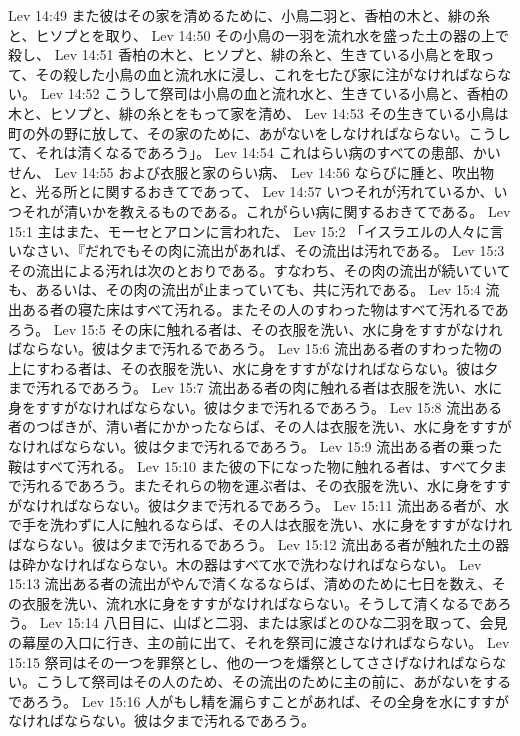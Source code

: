 Lev 14:49  また彼はその家を清めるために、小鳥二羽と、香柏の木と、緋の糸と、ヒソプとを取り、
Lev 14:50  その小鳥の一羽を流れ水を盛った土の器の上で殺し、
Lev 14:51  香柏の木と、ヒソプと、緋の糸と、生きている小鳥とを取って、その殺した小鳥の血と流れ水に浸し、これを七たび家に注がなければならない。
Lev 14:52  こうして祭司は小鳥の血と流れ水と、生きている小鳥と、香柏の木と、ヒソプと、緋の糸とをもって家を清め、
Lev 14:53  その生きている小鳥は町の外の野に放して、その家のために、あがないをしなければならない。こうして、それは清くなるであろう」。
Lev 14:54  これはらい病のすべての患部、かいせん、
Lev 14:55  および衣服と家のらい病、
Lev 14:56  ならびに腫と、吹出物と、光る所とに関するおきてであって、
Lev 14:57  いつそれが汚れているか、いつそれが清いかを教えるものである。これがらい病に関するおきてである。
Lev 15:1  主はまた、モーセとアロンに言われた、
Lev 15:2  「イスラエルの人々に言いなさい、『だれでもその肉に流出があれば、その流出は汚れである。
Lev 15:3  その流出による汚れは次のとおりである。すなわち、その肉の流出が続いていても、あるいは、その肉の流出が止まっていても、共に汚れである。
Lev 15:4  流出ある者の寝た床はすべて汚れる。またその人のすわった物はすべて汚れるであろう。
Lev 15:5  その床に触れる者は、その衣服を洗い、水に身をすすがなければならない。彼は夕まで汚れるであろう。
Lev 15:6  流出ある者のすわった物の上にすわる者は、その衣服を洗い、水に身をすすがなければならない。彼は夕まで汚れるであろう。
Lev 15:7  流出ある者の肉に触れる者は衣服を洗い、水に身をすすがなければならない。彼は夕まで汚れるであろう。
Lev 15:8  流出ある者のつばきが、清い者にかかったならば、その人は衣服を洗い、水に身をすすがなければならない。彼は夕まで汚れるであろう。
Lev 15:9  流出ある者の乗った鞍はすべて汚れる。
Lev 15:10  また彼の下になった物に触れる者は、すべて夕まで汚れるであろう。またそれらの物を運ぶ者は、その衣服を洗い、水に身をすすがなければならない。彼は夕まで汚れるであろう。
Lev 15:11  流出ある者が、水で手を洗わずに人に触れるならば、その人は衣服を洗い、水に身をすすがなければならない。彼は夕まで汚れるであろう。
Lev 15:12  流出ある者が触れた土の器は砕かなければならない。木の器はすべて水で洗わなければならない。
Lev 15:13  流出ある者の流出がやんで清くなるならば、清めのために七日を数え、その衣服を洗い、流れ水に身をすすがなければならない。そうして清くなるであろう。
Lev 15:14  八日目に、山ばと二羽、または家ばとのひな二羽を取って、会見の幕屋の入口に行き、主の前に出て、それを祭司に渡さなければならない。
Lev 15:15  祭司はその一つを罪祭とし、他の一つを燔祭としてささげなければならない。こうして祭司はその人のため、その流出のために主の前に、あがないをするであろう。
Lev 15:16  人がもし精を漏らすことがあれば、その全身を水にすすがなければならない。彼は夕まで汚れるであろう。
